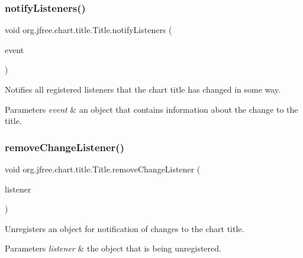 \subsubsection{\texorpdfstring{notify\+Listeners()}{notifyListeners()}}
{\footnotesize\ttfamily void org.\+jfree.\+chart.\+title.\+Title.\+notify\+Listeners (\begin{DoxyParamCaption}\item[{\mbox{\hyperlink{classorg_1_1jfree_1_1chart_1_1event_1_1_title_change_event}{Title\+Change\+Event}}}]{event }\end{DoxyParamCaption})\hspace{0.3cm}{\ttfamily [protected]}}

Notifies all registered listeners that the chart title has changed in some way.


\begin{DoxyParams}{Parameters}
{\em event} & an object that contains information about the change to the title. \\
\hline
\end{DoxyParams}
\mbox{\label{classorg_1_1jfree_1_1chart_1_1title_1_1_title_a8ffdcfa02c763d2da74bba1070b3a879}} 
\subsubsection{\texorpdfstring{remove\+Change\+Listener()}{removeChangeListener()}}
{\footnotesize\ttfamily void org.\+jfree.\+chart.\+title.\+Title.\+remove\+Change\+Listener (\begin{DoxyParamCaption}\item[{\mbox{\hyperlink{interfaceorg_1_1jfree_1_1chart_1_1event_1_1_title_change_listener}{Title\+Change\+Listener}}}]{listener }\end{DoxyParamCaption})}

Unregisters an object for notification of changes to the chart title.


\begin{DoxyParams}{Parameters}
{\em listener} & the object that is being unregistered. \\
\hline
\end{DoxyParams}
\mbox{\label{classorg_1_1jfree_1_1chart_1_1title_1_1_title_abbeb751cc0a5669d8abc3575fdf30147}} 
